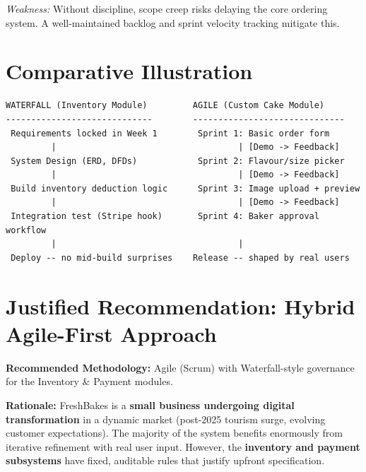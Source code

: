 \documentclass[12pt, a4paper]{report}
\begin{document}
\textit{Weakness:} Without discipline, scope creep risks delaying the core
ordering system. A well-maintained backlog and sprint velocity tracking
mitigate this.

\section{Comparative Illustration}

\begin{lstlisting}[style=wireframe]
WATERFALL (Inventory Module)         AGILE (Custom Cake Module)
-----------------------------        ------------------------------
 Requirements locked in Week 1        Sprint 1: Basic order form
         |                                    | [Demo -> Feedback]
 System Design (ERD, DFDs)            Sprint 2: Flavour/size picker
         |                                    | [Demo -> Feedback]
 Build inventory deduction logic      Sprint 3: Image upload + preview
         |                                    | [Demo -> Feedback]
 Integration test (Stripe hook)       Sprint 4: Baker approval workflow
         |                                    |
 Deploy -- no mid-build surprises    Release -- shaped by real users
\end{lstlisting}

\section{Justified Recommendation: Hybrid Agile-First Approach}

\begin{verdictbox}
\textbf{Recommended Methodology:} Agile (Scrum) with Waterfall-style
governance for the Inventory \& Payment modules.
\end{verdictbox}

\medskip
\textbf{Rationale:} FreshBakes is a \textbf{small business undergoing digital
transformation} in a dynamic market (post-2025 tourism surge, evolving customer
expectations). The majority of the system benefits enormously from iterative
refinement with real user input. However, the \textbf{inventory and payment
subsystems} have fixed, auditable rules that justify upfront specification.
\end{document}
